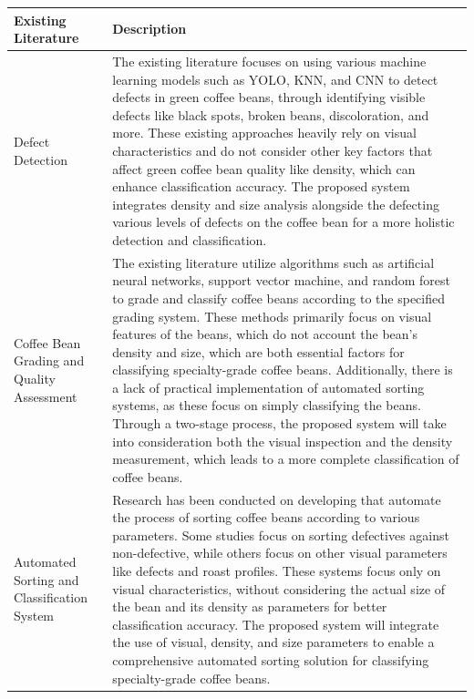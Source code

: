 \begin{center}
    \begin{longtable}{| p{4cm} | p{10cm} |}
    \hline
    Existing Literature & Description \\ \hline
    Defect Detection & The existing literature focuses on using various machine learning models such as YOLO, KNN, and CNN to detect defects in green coffee beans, 
	through identifying visible defects like black spots, broken beans, discoloration, and more. These existing approaches heavily rely on visual characteristics 
	and do not consider other key factors that affect green coffee bean quality like density, which can enhance classification accuracy. The proposed system 
	integrates density and size analysis alongside the defecting various levels of defects on the coffee bean for a more holistic detection and classification. \\ \hline
    Coffee Bean Grading and Quality Assessment & The existing literature utilize algorithms such as artificial neural networks, support vector machine, and random 
	forest to grade and classify coffee beans according to the specified grading system. These methods primarily focus on visual features of the beans, 
	which do not account the bean’s density and size, which are both essential factors for classifying specialty-grade coffee beans. Additionally, there is a lack of 
	practical implementation of automated sorting systems, as these focus on simply classifying the beans. Through a two-stage process, the proposed system will 
	take into consideration both the visual inspection and the density measurement, which leads to a more complete classification of coffee beans. \\ \hline
    Automated Sorting and Classification System & Research has been conducted on developing that automate the process of sorting coffee beans according to various parameters. 
	Some studies focus on sorting defectives against non-defective, while others focus on other visual parameters like defects and roast profiles. These systems focus only on visual 
	characteristics, without considering the actual size of the bean and its density as parameters for better classification accuracy. The proposed system will integrate the use of visual, density, and size parameters to enable a comprehensive automated sorting solution for classifying specialty-grade coffee beans. \\
    \hline
    \end{longtable}
\end{center}

